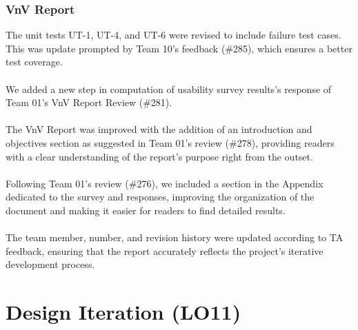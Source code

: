 \documentclass{article}
\begin{document}
\subsubsection{VnV Report}
The unit tests UT-1, UT-4, and UT-6 were revised to include failure test cases. This was update prompted by Team 10's feedback (\#285), which ensures a better test coverage.\\
\\
We added a new step in computation of usability survey results's response of Team 01's VnV Report Review (\#281).\\
\\
The VnV Report was improved with the addition of an introduction and objectives section as suggested in Team 01's review (\#278), providing readers with a clear understanding of the report's purpose right from the outset.\\
\\
Following Team 01's review (\#276), we included a section in the Appendix dedicated to the survey and responses, improving the organization of the document and making it easier for readers to find detailed results.\\
\\
The team member, number, and revision history were updated according to TA feedback, ensuring that the report accurately reflects the project's iterative development process.
\section{Design Iteration (LO11)}
\end{document}
